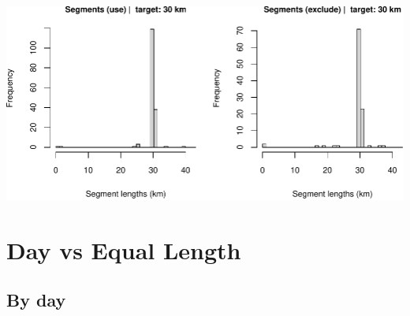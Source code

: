 \documentclass[
]{book}
\begin{document}
\includegraphics{figures/unnamed-chunk-93-1.pdf}

\hypertarget{day-vs-equal-length}{%
\section*{Day vs Equal Length}\label{day-vs-equal-length}}

\hypertarget{by-day}{%
\subsection*{By day}\label{by-day}}
\end{document}
